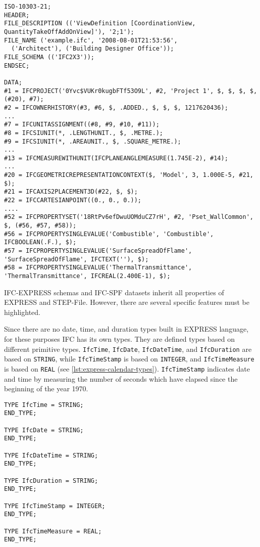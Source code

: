 \begin{lstlisting}[caption={Fragment of a STEP-File},label=lst:step-file]
ISO-10303-21;
HEADER;
FILE_DESCRIPTION (('ViewDefinition [CoordinationView, QuantityTakeOffAddOnView]'), '2;1');
FILE_NAME ('example.ifc', '2008-08-01T21:53:56', 
  ('Architect'), ('Building Designer Office'));
FILE_SCHEMA (('IFC2X3'));
ENDSEC;

DATA;
#1 = IFCPROJECT('0Yvc$VUKr0kugbFTf53O9L', #2, 'Project 1', $, $, $, $, (#20), #7);
#2 = IFCOWNERHISTORY(#3, #6, $, .ADDED., $, $, $, 1217620436);
...
#7 = IFCUNITASSIGNMENT((#8, #9, #10, #11));
#8 = IFCSIUNIT(*, .LENGTHUNIT., $, .METRE.);
#9 = IFCSIUNIT(*, .AREAUNIT., $, .SQUARE_METRE.);
...
#13 = IFCMEASUREWITHUNIT(IFCPLANEANGLEMEASURE(1.745E-2), #14);
...
#20 = IFCGEOMETRICREPRESENTATIONCONTEXT($, 'Model', 3, 1.000E-5, #21, $);
#21 = IFCAXIS2PLACEMENT3D(#22, $, $);
#22 = IFCCARTESIANPOINT((0., 0., 0.));
....
#52 = IFCPROPERTYSET('18RtPv6efDwuUOMduCZ7rH', #2, 'Pset_WallCommon', $, (#56, #57, #58));
#56 = IFCPROPERTYSINGLEVALUE('Combustible', 'Combustible', IFCBOOLEAN(.F.), $);
#57 = IFCPROPERTYSINGLEVALUE('SurfaceSpreadOfFlame', 'SurfaceSpreadOfFlame', IFCTEXT(''), $);
#58 = IFCPROPERTYSINGLEVALUE('ThermalTransmittance', 'ThermalTransmittance', IFCREAL(2.400E-1), $);
\end{lstlisting}



IFC-EXPRESS schemas and IFC-SPF datasets inherit all properties of EXPRESS and STEP-File.
However, there are several specific features must be highlighted.

Since there are no date, time, and duration types built in EXPRESS language, for these purposes IFC has its own types.
They are defined types based on different primitive types.
\texttt{IfcTime}, \texttt{IfcDate}, \texttt{IfcDateTime}, and \texttt{IfcDuration} are based on \texttt{STRING}, while \texttt{IfcTimeStamp} is based on \texttt{INTEGER}, and \texttt{IfcTimeMeasure} is based on \texttt{REAL} (see \autoref{lst:express-calendar-types}).
\texttt{IfcTimeStamp} indicates date and time by measuring the number of seconds which have elapsed since the beginning of the year 1970.


\begin{lstlisting}[caption={Examples of date, time and duration types},label=lst:express-calendar-types]
TYPE IfcTime = STRING;
END_TYPE;

TYPE IfcDate = STRING;
END_TYPE;

TYPE IfcDateTime = STRING;
END_TYPE;

TYPE IfcDuration = STRING;
END_TYPE;

TYPE IfcTimeStamp = INTEGER;
END_TYPE;

TYPE IfcTimeMeasure = REAL;
END_TYPE;
\end{lstlisting}


